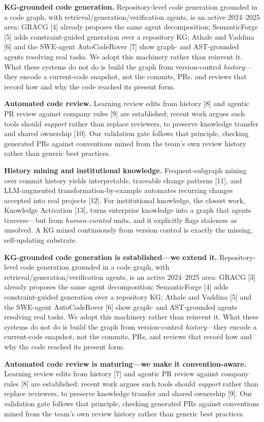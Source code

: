\documentclass[11pt, letterpaper]{article}
\begin{document}
\textbf{KG-grounded code generation.} Repository-level code generation grounded in a code graph, with retrieval/generation/verification agents, is an active 2024--2025 area: GRACG [4] already proposes the same agent decomposition; SemanticForge [5] adds constraint-guided generation over a repository KG; Athale and Vaddina [6] and the SWE-agent AutoCodeRover [7] show graph- and AST-grounded agents resolving real tasks. We adopt this machinery rather than reinvent it. What these systems do not do is build the graph from version-control \emph{history}---they encode a current-code snapshot, not the commits, PRs, and reviews that record how and why the code reached its present form.

\textbf{Automated code review.} Learning review edits from history [8] and agentic PR review against company rules [9] are established; recent work argues such tools should \emph{support} rather than replace reviewers, to preserve knowledge transfer and shared ownership [10]. Our validation gate follows that principle, checking generated PRs against conventions mined from the team's own review history rather than generic best practices.

\textbf{History mining and institutional knowledge.} Frequent-subgraph mining over commit history yields interpretable, traceable change patterns [11], and LLM-augmented transformation-by-example automates recurring changes accepted into real projects [12]. For institutional knowledge, the closest work, Knowledge Activation [13], turns enterprise knowledge into a graph that agents traverse---but from \emph{human-curated} units, and it explicitly flags staleness as unsolved. A KG mined continuously from version control is exactly the missing, self-updating substrate.

\textbf{KG-grounded code generation is established---we extend it.} Repository-level code generation grounded in a code graph, with retrieval/generation/verification agents, is an active 2024--2025 area: GRACG [3] already proposes the same agent decomposition; SemanticForge [4] adds constraint-guided generation over a repository KG; Athale and Vaddina [5] and the SWE-agent AutoCodeRover [6] show graph- and AST-grounded agents resolving real tasks. We adopt this machinery rather than reinvent it. What these systems do not do is build the graph from version-control \emph{history}---they encode a current-code snapshot, not the commits, PRs, and reviews that record how and why the code reached its present form.

\textbf{Automated code review is maturing---we make it convention-aware.} Learning review edits from history [7] and agentic PR review against company rules [8] are established; recent work argues such tools should \emph{support} rather than replace reviewers, to preserve knowledge transfer and shared ownership [9]. Our validation gate follows that principle, checking generated PRs against conventions mined from the team's own review history rather than generic best practices.
\end{document}
